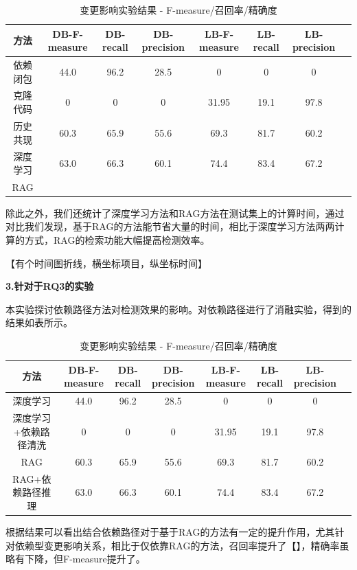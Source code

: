 \begin{table}[htbp]
\caption{变更影响实验结果 - F-measure/召回率/精确度}
\vspace{0.5em}\centering\wuhao
\begin{tabular}{cccccccc}
\toprule
方法 & DB-F-measure & DB-recall & DB-precision & LB-F-measure & LB-recall & LB-precision  \\
\midrule
依赖闭包 & 44.0 & 96.2 & 28.5 & 0 & 0 & 0 \\
克隆代码 & 0 & 0 &  0 & 31.95 & 19.1 & 97.8 \\
历史共现 & 60.3 & 65.9 & 55.6 & 69.3 & 81.7 & 60.2 \\
深度学习 & 63.0 & 66.3 & 60.1 & 74.4 & 83.4 & 67.2 \\
RAG &  &  &  &  &  &  \\
\bottomrule
\end{tabular}
\end{table}

除此之外，我们还统计了深度学习方法和RAG方法在测试集上的计算时间，通过对比我们发现，基于RAG的方法能节省大量的时间，相比于深度学习方法两两计算的方式，RAG的检索功能大幅提高检测效率。

【有个时间图折线，横坐标项目，纵坐标时间】

\textbf{3.针对于RQ3的实验}

本实验探讨依赖路径方法对检测效果的影响。对依赖路径进行了消融实验，得到的结果如表所示。

\begin{table}[htbp]
\caption{变更影响实验结果 - F-measure/召回率/精确度}
\vspace{0.5em}\centering\wuhao
\begin{tabular}{cccccccc}
\toprule
方法 & DB-F-measure & DB-recall & DB-precision & LB-F-measure & LB-recall & LB-precision  \\
\midrule
深度学习 & 44.0 & 96.2 & 28.5 & 0 & 0 & 0 \\
深度学习+依赖路径清洗 & 0 & 0 &  0 & 31.95 & 19.1 & 97.8 \\
RAG & 60.3 & 65.9 & 55.6 & 69.3 & 81.7 & 60.2 \\
RAG+依赖路径推理 & 63.0 & 66.3 & 60.1 & 74.4 & 83.4 & 67.2 \\
\bottomrule
\end{tabular}
\end{table}

根据结果可以看出结合依赖路径对于基于RAG的方法有一定的提升作用，尤其针对依赖型变更影响关系，相比于仅依靠RAG的方法，召回率提升了【】，精确率虽略有下降，但F-measure提升了。

